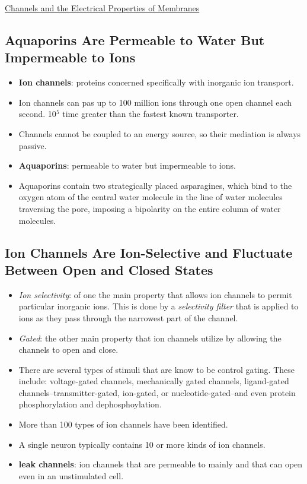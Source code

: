 \documentclass[12pt,letterpaper]{article}
\begin{document}
\hypertarget{11.3}{}
\begin{secbox}{\hyperlink{11}{Channels and the Electrical Properties of Membranes}}{
    \hypertarget{11.3.1}{\subsection*{Aquaporins Are Permeable to Water But Impermeable to Ions}}
    \begin{itemize}
        \item \textbf{Ion channels}: proteins concerned specifically with inorganic ion transport.
        \item Ion channels can pas up to 100 million ions through one open channel each second. 10$^5$ time greater than the fastest known transporter. 
        \item Channels cannot be coupled to an energy source, so their mediation is always passive.
        \item \textbf{Aquaporins}: permeable to water but impermeable to ions.
        \item Aquaporins contain two strategically placed asparagines, which bind to the oxygen atom of the central water molecule in the line of water molecules traversing the pore, imposing a bipolarity on the entire column of water molecules.
    \end{itemize}

    \hypertarget{11.3.2}{\subsection*{Ion Channels Are Ion-Selective and Fluctuate Between Open and Closed States}}
    \begin{itemize}
        \item \textit{Ion selectivity}: of one the main property that allows ion channels to permit particular inorganic ions. This is done by a \textit{selectivity filter} that is applied to ions as they pass through the narrowest part of the channel.
        \item \textit{Gated}: the other main property that ion channels utilize by allowing the channels to open and close. 
        \item There are several types of stimuli that are know to be control gating. These include: voltage-gated channels, mechanically gated channels, ligand-gated channels--transmitter-gated, ion-gated, or nucleotide-gated--and even protein phosphorylation and dephosphoylation. 
        \item More than 100 types of ion channels have been identified. 
        \item A single neuron typically contains 10 or more kinds of ion channels.
        \item \textbf{ leak channels}: ion channels that are permeable to mainly  and that can open even in an unstimulated cell. 
    \end{itemize}

}
\end{secbox}
\end{document}

